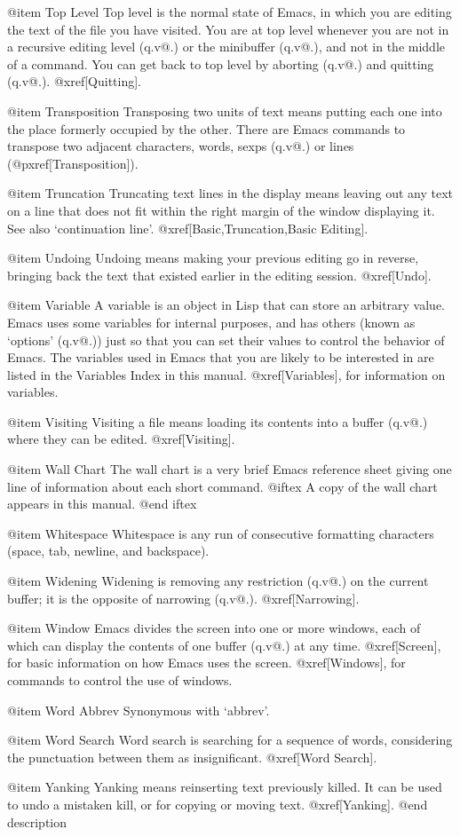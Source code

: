 @item Top Level
Top level is the normal state of Emacs, in which you are editing the text
of the file you have visited.  You are at top level whenever you are not in
a recursive editing level (q.v@.) or the minibuffer (q.v@.), and not in the
middle of a command.  You can get back to top level by aborting (q.v@.) and
quitting (q.v@.).  @xref[Quitting].

@item Transposition
Transposing two units of text means putting each one into the place
formerly occupied by the other.  There are Emacs commands to transpose two
adjacent characters, words, sexps (q.v@.) or lines (@pxref[Transposition]).

@item Truncation
Truncating text lines in the display means leaving out any text on a line
that does not fit within the right margin of the window displaying it.
See also `continuation line'.  @xref[Basic,Truncation,Basic Editing].

@item Undoing
Undoing means making your previous editing go in reverse, bringing back the
text that existed earlier in the editing session.  @xref[Undo].

@item Variable
A variable is an object in Lisp that can store an arbitrary value.
Emacs uses some variables for internal purposes, and has others (known as
`options' (q.v@.)) just so that you can set their values to control the
behavior of Emacs.  The variables used in Emacs that you are likely to be
interested in are listed in the Variables Index in this manual.
@xref[Variables], for information on variables.

@item Visiting
Visiting a file means loading its contents into a buffer (q.v@.) where they
can be edited.  @xref[Visiting].

@item Wall Chart
The wall chart is a very brief Emacs reference sheet giving one line of
information about each short command.
@iftex
A copy of the wall chart appears in this manual.
@end iftex

@item Whitespace
Whitespace is any run of consecutive formatting characters (space, tab,
newline, and backspace).

@item Widening
Widening is removing any restriction (q.v@.) on the current buffer; it is
the opposite of narrowing (q.v@.).  @xref[Narrowing].

@item Window
Emacs divides the screen into one or more windows, each of which can
display the contents of one buffer (q.v@.) at any time.  @xref[Screen], for
basic information on how Emacs uses the screen.  @xref[Windows], for
commands to control the use of windows.

@item Word Abbrev
Synonymous with `abbrev'.

@item Word Search
Word search is searching for a sequence of words, considering the
punctuation between them as insignificant.  @xref[Word Search].

@item Yanking
Yanking means reinserting text previously killed.  It can be used to undo a
mistaken kill, or for copying or moving text.  @xref[Yanking].
@end description
